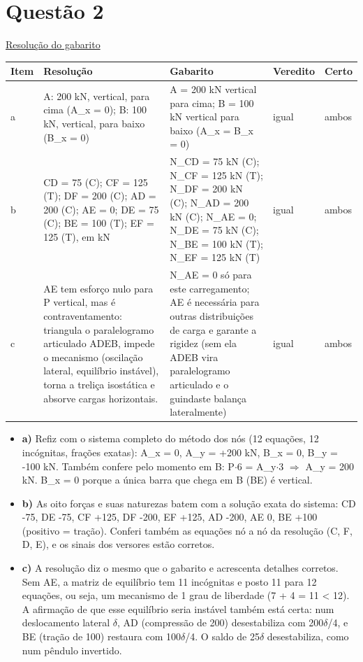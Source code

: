 \documentclass{article}%
\begin{document}
\section*{Questão 2}%
\href{https://poliedroresolve.sistemapoliedro.com.br/vestibulares/ime/2027/ime-2-fase-dia-2-27-10-2026-2-fase-dia-2/dissertativa-2-fisica-2-fase-dia-2-ime-2027}{Resolução do gabarito}\par\smallskip%
\begin{longtable}{@{}p{} p{} p{} p{} p{}@{}}\toprule Item & Resolução & Gabarito & Veredito & Certo \\ \midrule
a & A: 200 kN, vertical, para cima (A\_x = 0); B: 100 kN, vertical, para baixo (B\_x = 0) & A = 200 kN vertical para cima; B = 100 kN vertical para baixo (A\_x = B\_x = 0) & igual & ambos \\
b & CD = 75 (C); CF = 125 (T); DF = 200 (C); AD = 200 (C); AE = 0; DE = 75 (C); BE = 100 (T); EF = 125 (T), em kN & N\_CD = 75 kN (C); N\_CF = 125 kN (T); N\_DF = 200 kN (C); N\_AD = 200 kN (C); N\_AE = 0; N\_DE = 75 kN (C); N\_BE = 100 kN (T); N\_EF = 125 kN (T) & igual & ambos \\
c & AE tem esforço nulo para P vertical, mas é contraventamento: triangula o paralelogramo articulado ADEB, impede o mecanismo (oscilação lateral, equilíbrio instável), torna a treliça isostática e absorve cargas horizontais. & N\_AE = 0 só para este carregamento; AE é necessária para outras distribuições de carga e garante a rigidez (sem ela ADEB vira paralelogramo articulado e o guindaste balança lateralmente) & igual & ambos \\
\bottomrule\end{longtable}%
\begin{itemize}%
\item%
\textbf{a)} Refiz com o sistema completo do método dos nós (12 equações, 12 incógnitas, frações exatas): A\_x = 0, A\_y = +200 kN, B\_x = 0, B\_y = -100 kN. Também confere pelo momento em B: P$\cdot$6 = A\_y$\cdot$3 $\Rightarrow$ A\_y = 200 kN. B\_x = 0 porque a única barra que chega em B (BE) é vertical.%
\item%
\textbf{b)} As oito forças e suas naturezas batem com a solução exata do sistema: CD -75, DE -75, CF +125, DF -200, EF +125, AD -200, AE 0, BE +100 (positivo = tração). Conferi também as equações nó a nó da resolução (C, F, D, E), e os sinais dos versores estão corretos.%
\item%
\textbf{c)} A resolução diz o mesmo que o gabarito e acrescenta detalhes corretos. Sem AE, a matriz de equilíbrio tem 11 incógnitas e posto 11 para 12 equações, ou seja, um mecanismo de 1 grau de liberdade (7 + 4 = 11 < 12). A afirmação de que esse equilíbrio seria instável também está certa: num deslocamento lateral $\delta$, AD (compressão de 200) desestabiliza com 200$\delta$/4, e BE (tração de 100) restaura com 100$\delta$/4. O saldo de 25$\delta$ desestabiliza, como num pêndulo invertido.%
\end{itemize}%
\end{document}
